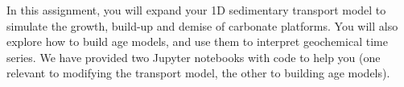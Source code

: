 \noindent In this assignment, you will expand your 1D sedimentary transport model to simulate the growth, build-up and demise of carbonate platforms. You will also explore how to build age models, and use them to interpret geochemical time series. We have provided two Jupyter notebooks with code to help you (one relevant to modifying the transport model, the other to building age models).
